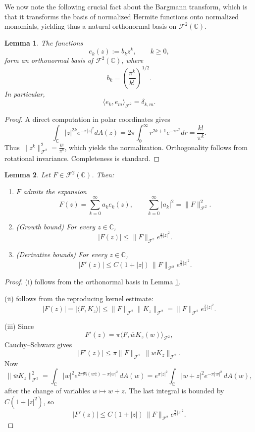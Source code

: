 \documentclass[a4paper,11pt,reqno]{amsart}
\numberwithin{equation}{section}
\theoremstyle{plain} %
\newtheorem{lemma}{Lemma}[section]
\theoremstyle{definition} %
\theoremstyle{remark}
\newcommand{\C}{\mathbb{C}}
\begin{document}
\medskip

We now note the following crucial fact about the Bargmann transform, which is that it transforms the basis of normalized Hermite functions onto normalized monomials, yielding thus a natural orthonormal basis on $\mathcal{F}^2(\C).$

\begin{lemma}\label{lem:monomials}
The functions
\[
e_k(z) := b_k z^k, \qquad k \ge 0,
\]
form an orthonormal basis of $\mathcal{F}^2(\mathbb{C})$, where
\[
b_k = \left( \frac{\pi^k}{k!} \right)^{1/2}.
\]
In particular,
\[
\langle e_k, e_m \rangle_{\mathcal{F}^2} = \delta_{k,m}.
\]
\end{lemma}

\begin{proof}
A direct computation in polar coordinates gives
\[
\int_{\mathbb{C}} |z|^{2k} e^{-\pi |z|^2} dA(z)
= 2\pi \int_0^\infty r^{2k+1} e^{-\pi r^2} dr
= \frac{k!}{\pi^k}.
\]
Thus $\|z^k\|_{\mathcal{F}^2}^2 = \frac{k!}{\pi^k}$, which yields the normalization.
Orthogonality follows from rotational invariance.
Completeness is standard.
\end{proof}

\medskip

\begin{lemma}\label{lem:growth}
Let $F \in \mathcal{F}^2(\mathbb{C})$. Then:
\begin{enumerate}
\item[(i)] $F$ admits the expansion
\[
F(z) = \sum_{k=0}^\infty a_k e_k(z),
\qquad \sum_{k=0}^\infty |a_k|^2 = \|F\|_{\mathcal{F}^2}^2.
\]

\item[(ii)] (Growth bound) For every $z \in \mathbb{C}$,
\[
|F(z)| \le \|F\|_{\mathcal{F}^2} e^{\frac{\pi}{2}|z|^2}.
\]

\item[(iii)] (Derivative bounds) For every $z \in \mathbb{C}$,
\[
|F'(z)| \le C(1+|z|)\, \|F\|_{\mathcal{F}^2} e^{\frac{\pi}{2}|z|^2}.
\]
\end{enumerate}
\end{lemma}

\begin{proof}
(i) follows from the orthonormal basis in Lemma \ref{lem:monomials}.

(ii) follows from the reproducing kernel estimate:
\[
|F(z)| = |\langle F, K_z \rangle|
\le \|F\|_{\mathcal{F}^2} \|K_z\|_{\mathcal{F}^2}
= \|F\|_{\mathcal{F}^2} e^{\frac{\pi}{2}|z|^2}.
\]

(iii) Since
\[
F'(z)=\pi \langle F,\overline{w}K_z(w)\rangle_{\mathcal F^2},
\]
Cauchy--Schwarz gives
\[
|F'(z)|
\le
\pi \|F\|_{\mathcal F^2}\,\|\overline{w}K_z\|_{\mathcal F^2}.
\]
Now
\[
\|\overline{w}K_z\|_{\mathcal F^2}^2
=
\int_{\C} |w|^2 e^{2\pi\Re(w\overline z)-\pi |w|^2}\,dA(w)
=
e^{\pi |z|^2}\int_{\C} |w+z|^2 e^{-\pi |w|^2}\,dA(w),
\]
after the change of variables \(w\mapsto w+z\). The last integral is bounded by
\(C(1+|z|^2)\), so
\[
|F'(z)| \le C(1+|z|)\,\|F\|_{\mathcal F^2}e^{\frac{\pi}{2}|z|^2}.
\]
\end{proof}
\end{document}
